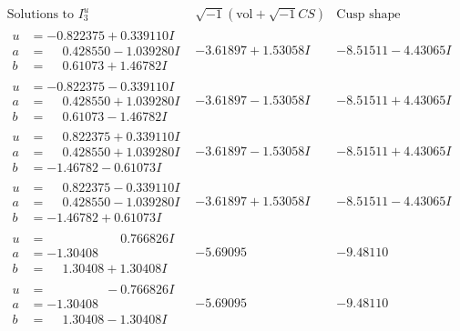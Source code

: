\documentclass[1p]{elsarticle_modified}
\theoremstyle{definition}
\newcommand{\I}{\sqrt{-1}}
\begin{document}
$$\begin{array}{c|c|c}  
\text{Solutions to }I^u_{3}& \I (\text{vol} + \sqrt{-1}CS) & \text{Cusp shape}\\
 \hline 
\begin{aligned}
u &= -0.822375 + 0.339110 I \\
a &= \phantom{-}0.428550 - 1.039280 I \\
b &= \phantom{-}0.61073 + 1.46782 I\end{aligned}
 & -3.61897 + 1.53058 I & -8.51511 - 4.43065 I \\ \hline\begin{aligned}
u &= -0.822375 - 0.339110 I \\
a &= \phantom{-}0.428550 + 1.039280 I \\
b &= \phantom{-}0.61073 - 1.46782 I\end{aligned}
 & -3.61897 - 1.53058 I & -8.51511 + 4.43065 I \\ \hline\begin{aligned}
u &= \phantom{-}0.822375 + 0.339110 I \\
a &= \phantom{-}0.428550 + 1.039280 I \\
b &= -1.46782 - 0.61073 I\end{aligned}
 & -3.61897 - 1.53058 I & -8.51511 + 4.43065 I \\ \hline\begin{aligned}
u &= \phantom{-}0.822375 - 0.339110 I \\
a &= \phantom{-}0.428550 - 1.039280 I \\
b &= -1.46782 + 0.61073 I\end{aligned}
 & -3.61897 + 1.53058 I & -8.51511 - 4.43065 I \\ \hline\begin{aligned}
u &= \phantom{-0.000000 -}0.766826 I \\
a &= -1.30408\phantom{ +0.000000I} \\
b &= \phantom{-}1.30408 + 1.30408 I\end{aligned}
 & -5.69095\phantom{ +0.000000I} & -9.48110\phantom{ +0.000000I} \\ \hline\begin{aligned}
u &= \phantom{-0.000000 } -0.766826 I \\
a &= -1.30408\phantom{ +0.000000I} \\
b &= \phantom{-}1.30408 - 1.30408 I\end{aligned}
 & -5.69095\phantom{ +0.000000I} & -9.48110\phantom{ +0.000000I} \\ \hline\begin{aligned}

\end{aligned}
\end{array}$$
\end{document}
